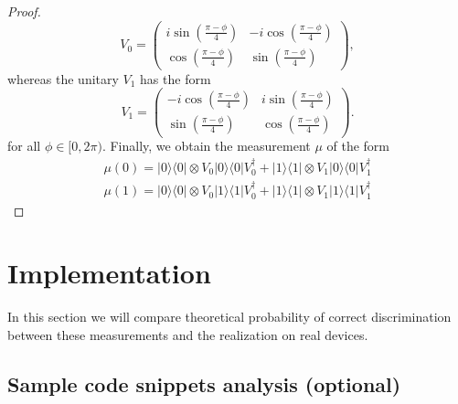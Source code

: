 \documentclass[preprint,12pt, a4paper]{elsarticle}
\newcommand{\ket}[1]{\ensuremath{|#1\rangle}}
\newcommand{\bra}[1]{\ensuremath{\langle#1|}}
\newcommand{\ketbra}[2]{\ensuremath{\ket{#1}\bra{#2}}}
\newcommand{\proj}[1]{\ensuremath{\ketbra{#1}{#1}}}
\newcommand{\1}{{\rm 1\hspace{-0.9mm}l}}
\begin{document}
\begin{proof}
\begin{equation}
V_0 = \left(\begin{array}{cc}i \sin\left( \frac{\pi - \phi}{4} \right)&-i 
\cos\left( \frac{\pi - \phi}{4} \right)\\ \cos\left( \frac{\pi - 
	\phi}{4}\right)& \sin\left( \frac{\pi - \phi}{4} \right)\end{array}\right),
\end{equation}
whereas the unitary  $V_1$  has the form
\begin{equation}
V_1 = \left(\begin{array}{cc}-i \cos\left(\frac{\pi - \phi}{4}\right) &i 
\sin\left( \frac{\pi - \phi}{4}\right)\\\sin\left( \frac{\pi - \phi}{4} 
\right) &  \cos\left( \frac{\pi - \phi}{4} \right) \end{array}\right).
\end{equation}
for all $\phi \in [0,2\pi)$. 
Finally, we obtain the measurement $\mu$ of the form
\begin{equation}
\begin{split}
\mu(0) = \proj{0} \otimes V_0 \proj{0} V_0^\dagger +  \proj{1} \otimes V_1 
\proj{0} V_1^\dagger  \\ 
\mu(1) = \proj{0} \otimes V_0 \proj{1} V_0^\dagger +  \proj{1} \otimes V_1 
\proj{1} V_1^\dagger  
\end{split}
\end{equation} 



\end{proof}


\section{Implementation}
In this section we will compare theoretical probability of correct 
discrimination between these measurements and the realization on real devices.


\subsection{Sample code snippets analysis (optional)}
\label{}



\end{document}
